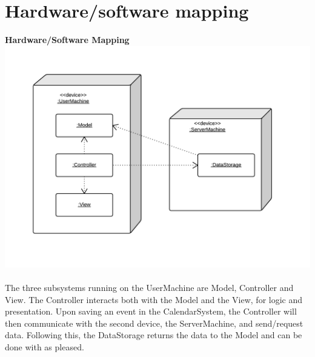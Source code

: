 \section{Hardware/software mapping}
\textbf{Hardware/Software Mapping}\\
\includegraphics[scale=0.4]{HardwareSoftwareMapping}\\\\
The three subsystems running on the UserMachine are Model, Controller and View. The Controller interacts both with the Model and the View, for logic and presentation. Upon saving an event in the CalendarSystem, the Controller will then communicate with the second device, the ServerMachine, and send/request data. Following this, the DataStorage returns the data to the Model and can be done with as pleased.